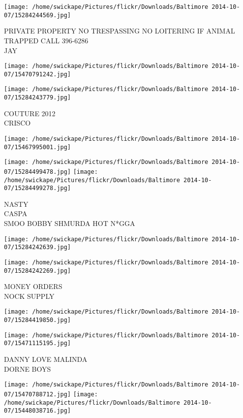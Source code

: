 \documentclass[10pt,letterpaper]{article}
\begin{document}
\vspace{0.25in}
\texttt{[image: /home/swickape/Pictures/flickr/Downloads/Baltimore 2014-10-07/15284244569.jpg]}

PRIVATE PROPERTY NO TRESPASSING NO LOITERING IF ANIMAL TRAPPED CALL 396{-}6286\\
JAY
\pagebreak

\texttt{[image: /home/swickape/Pictures/flickr/Downloads/Baltimore 2014-10-07/15470791242.jpg]}

\vspace{0.25in}
\texttt{[image: /home/swickape/Pictures/flickr/Downloads/Baltimore 2014-10-07/15284243779.jpg]}

COUTURE 2012\\
CRISCO
\pagebreak

\texttt{[image: /home/swickape/Pictures/flickr/Downloads/Baltimore 2014-10-07/15467995001.jpg]}

\vspace{0.25in}
\texttt{[image: /home/swickape/Pictures/flickr/Downloads/Baltimore 2014-10-07/15284499478.jpg]}
\texttt{[image: /home/swickape/Pictures/flickr/Downloads/Baltimore 2014-10-07/15284499278.jpg]}

NASTY\\
CASPA\\
SMOO BOBBY SHMURDA HOT N*GGA
\pagebreak

\texttt{[image: /home/swickape/Pictures/flickr/Downloads/Baltimore 2014-10-07/15284242639.jpg]}

\vspace{0.25in}
\texttt{[image: /home/swickape/Pictures/flickr/Downloads/Baltimore 2014-10-07/15284242269.jpg]}

MONEY ORDERS\\
NOCK SUPPLY
\pagebreak

\texttt{[image: /home/swickape/Pictures/flickr/Downloads/Baltimore 2014-10-07/15284419850.jpg]}

\vspace{0.25in}
\texttt{[image: /home/swickape/Pictures/flickr/Downloads/Baltimore 2014-10-07/15471115195.jpg]}

DANNY LOVE MALINDA\\
DORNE BOYS
\pagebreak

\texttt{[image: /home/swickape/Pictures/flickr/Downloads/Baltimore 2014-10-07/15470788712.jpg]}
\texttt{[image: /home/swickape/Pictures/flickr/Downloads/Baltimore 2014-10-07/15448038716.jpg]}
\end{document}

